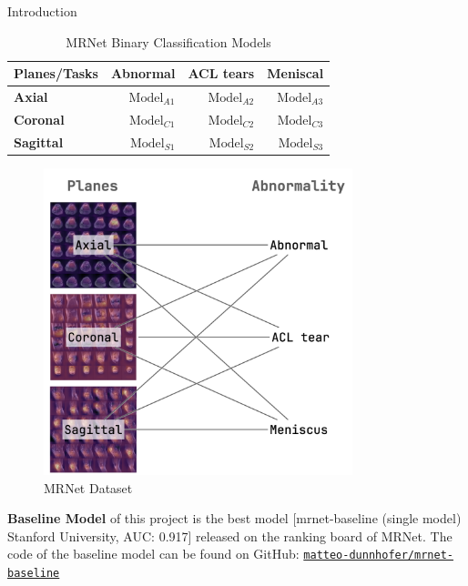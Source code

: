 \documentclass[final]{beamer}
\newlength{\colwidth}
\begin{document}
\begin{frame}[t]
\begin{columns}[t]
\begin{column}{\colwidth}
\begin{block}{Introduction}
    \begin{table}
      \centering
      \begin{tabular}{l r r r}
        \toprule
        \textbf{Planes/Tasks} & \textbf{Abnormal} & \textbf{ACL tears} & \textbf{Meniscal} \\
        \midrule
        \textbf{Axial} & $\text{Model}_{A1}$ & $\text{Model}_{A2}$ & $\text{Model}_{A3}$ \\
        \textbf{Coronal} & $\text{Model}_{C1}$ & $\text{Model}_{C2}$ & $\text{Model}_{C3}$ \\
        \textbf{Sagittal} & $\text{Model}_{S1}$ & $\text{Model}_{S2}$ & $\text{Model}_{S3}$ \\
        \bottomrule
      \end{tabular}
      \caption{MRNet Binary Classification Models}
    \end{table}

    \begin{figure}[!htp]
    \centering
    \includegraphics[width=0.8\textwidth]{dataset_visual.png}
    \caption{\label{fig:dataset}MRNet Dataset}
    \end{figure}

    \textbf{Baseline Model} of this project is the best model [mrnet-baseline (single model) Stanford University, AUC: 0.917] released on the ranking board of MRNet. The code of the baseline model can be found on GitHub: \href{https://github.com/matteo-dunnhofer/mrnet-baseline}{\verb|matteo-dunnhofer/mrnet-baseline|}


\end{block}
\end{column}
\end{columns}
\end{frame}
\end{document}
